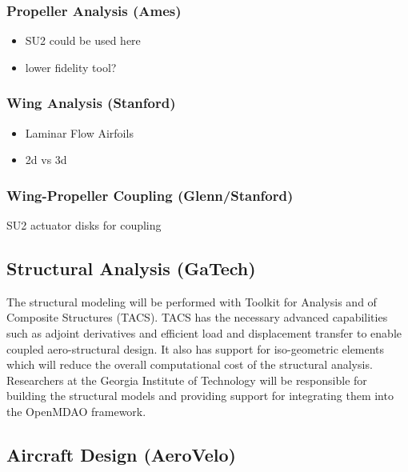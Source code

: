 \documentclass[]{aiaa-tc}
\begin{document}
    \subsubsection{Propeller Analysis (Ames)}
        \begin{itemize}
            \item SU2 could be used here
            \item lower fidelity tool? 
        \end{itemize}

    \subsubsection{Wing Analysis (Stanford)}
        \begin{itemize}
            \item Laminar Flow Airfoils
            \item 2d vs 3d 
        \end{itemize}

    \subsubsection{Wing-Propeller Coupling (Glenn/Stanford)}
        \begin{item}
            \item SU2 actuator disks for coupling
        \end{item}

    \subsection{Structural Analysis (GaTech)}

    The structural modeling will be performed with Toolkit for Analysis and of Composite 
    Structures (TACS). TACS has the necessary advanced capabilities such as adjoint derivatives 
    and efficient load and displacement transfer to enable coupled aero­-structural design. It also has 
    support for iso-geometric elements which will reduce the overall computational cost of the 
    structural analysis. Researchers at the Georgia Institute of Technology will be responsible for 
    building the structural models and providing support for integrating them into the OpenMDAO framework. 

    \subsection{Aircraft Design (AeroVelo)}
\end{document}
